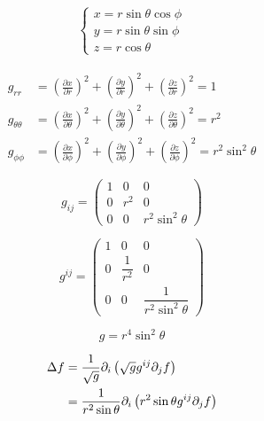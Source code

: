 \documentclass[a4paper,11pt]{article}
\begin{document}
\begin{center}
  
\end{center}

\begin{align}
  \begin{cases}
    x = r \sin \theta \cos \phi \\
    y = r \sin \theta \sin \phi \\
    z = r \cos \theta
  \end{cases}
\end{align}

\begin{align}
  g_{rr}           & = \left( \frac{\partial{x}}{\partial{r}} \right)^2 + \left( \frac{\partial{y}}{\partial{r}} \right)^2 + \left( \frac{\partial{z}}{\partial{r}} \right)^2 = 1                          \\
  g_{\theta\theta} & = \left( \frac{\partial{x}}{\partial{\theta}} \right)^2 + \left( \frac{\partial{y}}{\partial{\theta}} \right)^2 + \left( \frac{\partial{z}}{\partial{\theta}} \right)^2 = r^2         \\
  g_{\phi\phi}     & = \left( \frac{\partial{x}}{\partial{\phi}} \right)^2 + \left( \frac{\partial{y}}{\partial{\phi}} \right)^2 + \left( \frac{\partial{z}}{\partial{\phi}} \right)^2 = r^2 \sin^2 \theta
\end{align}

\begin{equation}
  g_{ij} =
  \begin{pmatrix}
    1 & 0   & 0                 \\
    0 & r^2 & 0                 \\
    0 & 0   & r^2 \sin^2 \theta
  \end{pmatrix}
\end{equation}

\begin{equation}
  g^{ij} =
  \begin{pmatrix}
    1 & 0              & 0                            \\
    0 & \dfrac{1}{r^2} & 0                            \\
    0 & 0              & \dfrac{1}{r^2 \sin^2 \theta}
  \end{pmatrix}
\end{equation}

\begin{equation}
  g = r^4 \sin^2 \theta
\end{equation}

\begin{align}
  \Delta f & = \frac{1}{\sqrt{g}}\partial_{i}\left( \sqrt{g}g^{ij}\partial_{j}f \right) \noindent     \\
           & =\frac{1}{r^2 \sin \theta}\partial_{i}\left( r^2 \sin \theta g^{ij}\partial_{j}f \right)
\end{align}
\end{document}
